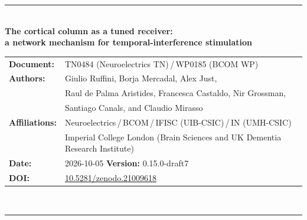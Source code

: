 \documentclass[11pt,a4paper]{article}
\newif\ifsupp
\newcommand{\paperver}{0.15.0-draft7} %
\begin{document}
\vspace{6pt}
\else
\begin{flushleft}
{\color{neblue}\rule{\textwidth}{2pt}}\\[4pt]
{\LARGE\bfseries The cortical column as a tuned receiver:\\[2pt]
a network mechanism for temporal-interference stimulation}\\[10pt]
\begin{tabular}{@{}ll@{}}
\textbf{Document:} & TN0484 (Neuroelectrics TN)\,/\,WP0185 (BCOM WP) \\
\textbf{Authors:} & Giulio Ruffini, Borja Mercadal, Alex Just,\\
& Raul de Palma Aristides, Francesca Castaldo, Nir Grossman,\\
& Santiago Canals, and Claudio Mirasso \\
\textbf{Affiliations:} & Neuroelectrics\,/\,BCOM\,/\,IFISC (UIB-CSIC)\,/\,IN (UMH-CSIC)\\
& Imperial College London (Brain Sciences and UK Dementia Research Institute) \\
\textbf{Date:} & 2026-10-05 \qquad \textbf{Version:} \paperver \\
\textbf{DOI:} & \href{https://doi.org/10.5281/zenodo.21009618}{10.5281/zenodo.21009618} \\
\end{tabular}\\[4pt]
{\color{neblue}\rule{\textwidth}{1pt}}
\end{flushleft}
\fi

\ifsupp
\begin{center}
{\large\bfseries Supplementary Material}\\[4pt]
\begin{minipage}{0.86\textwidth}\centering\small
Appendices and supplementary figures accompanying the article. Section, equation and
figure numbers referenced here follow the main text; supplementary figures are numbered
S1, S2, \dots
\end{minipage}
\end{center}
\vspace{8pt}
\fi

\ifsupp\else
\end{document}
